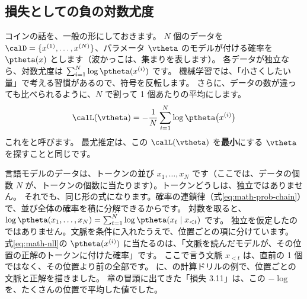 \subsection*{損失としての負の対数尤度}

コインの話を、一般の形にしておきます。
$N$ 個のデータを $\calD=\{x^{(1)},\dots,x^{(N)}\}$、パラメータ $\vtheta$ のモデルが付ける確率を $\ptheta(x)$ とします（波かっこは、集まりを表します）。
各データが独立なら、対数尤度は $\sum_{i=1}^{N}\log\ptheta(x^{(i)})$ です。
機械学習では、「小さくしたい量」で考える習慣があるので、符号を反転します。
さらに、データの数が違っても比べられるように、$N$ で割って 1 個あたりの平均にします。
\begin{equation}
\calL(\vtheta)=-\frac{1}{N}\sum_{i=1}^{N}\log\ptheta\bigl(x^{(i)}\bigr)
\label{eq:math-nll}
\end{equation}
これをと呼びます。
最尤推定は、この $\calL(\vtheta)$ を\textbf{最小}にする $\vtheta$ を探すことと同じです。

言語モデルのデータは、トークンの並び $x_1,\dots,x_N$ です（ここでは、データの個数 $N$ が、トークンの個数に当たります）。トークンどうしは、独立ではありません。
それでも、同じ形の式になります。確率の連鎖律（式\eqref{eq:math-prob-chain}）で、並び全体の確率を積に分解できるからです。
対数を取ると、$\log\ptheta(x_1,\dots,x_N)=\sum_{t=1}^{N}\log\ptheta(x_t\mid x_{<t})$ です。
独立を仮定したのではありません。文脈を条件に入れたうえで、位置ごとの項に分けています。
式\eqref{eq:math-nll}の $\ptheta(x^{(i)})$ に当たるのは、「文脈を読んだモデルが、その位置の正解のトークンに付けた確率」です。
ここで言う文脈 $x_{<t}$ は、直前の 1 個ではなく、その位置より前の全部です。
に、の計算ドリルの例で、位置ごとの文脈と正解を描きました。
章の冒頭に出てきた「損失 3.11」は、この $-\log$ を、たくさんの位置で平均した値でした。


